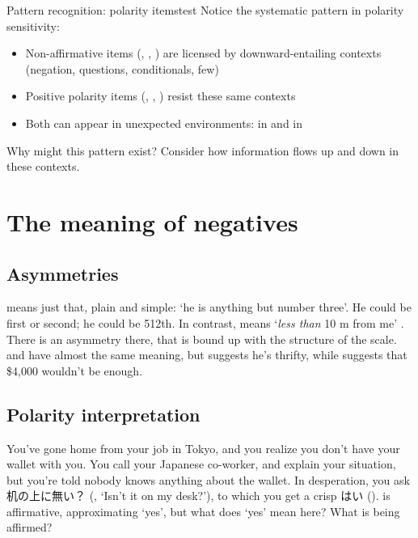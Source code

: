 \begin{tblsframedsymbol}{Pattern recognition: polarity items}{test}
Notice the systematic pattern in polarity sensitivity:
\begin{itemize}[noitemsep, leftmargin=*]
    \item Non-affirmative items (, , ) are licensed by downward-entailing contexts (negation, questions, conditionals, few)
    \item Positive polarity items (, , ) resist these same contexts
    \item Both can appear in unexpected environments:  in  and  in 
\end{itemize}
Why might this pattern exist? Consider how information flows up and down in these contexts.
\end{tblsframedsymbol}

\section{The meaning of negatives} \label{sec:meaning-of-negatives}

\subsection{Asymmetries}
 means just that, plain and simple: `he is anything but number three'. He could be first or second; he could be 512th. In contrast,  means `\emph{less than} 10 m from me' \citep[81]{Jespersen1917}. There is an asymmetry there, that is bound up with the structure of the scale.  and  have almost the same meaning, but  suggests he's thrifty, while  suggests that \$4,000 wouldn't be enough.

\subsection{Polarity interpretation}

You've gone home from your job in Tokyo, and you realize you don't have your wallet with you. You call your Japanese co-worker, and explain your situation, but you're told nobody knows anything about the wallet. In desperation, you ask 机の上に無い？ (, `Isn't it on my desk?'), to which you get a crisp {はい} ().  is affirmative, approximating `yes', but what does `yes' mean here? What is being affirmed?


